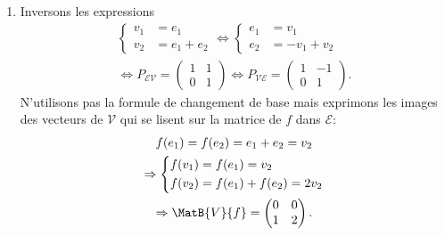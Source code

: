 \begin{enumerate}
 \item Inversons les expressions
\begin{multline*}
 \left\lbrace 
 \begin{aligned}
  v_1 &= e_1 \\ v_2 &= e_1 + e_2
 \end{aligned}
 \right. 
\Leftrightarrow
 \left\lbrace 
 \begin{aligned}
  e_1 &= v_1 \\ e_2 &= - v_1 + v_2
 \end{aligned}
 \right. \\
 \Leftrightarrow P_{\mathcal{E} \mathcal{V}} = \begin{pmatrix}
                                                1 & 1 \\ 0 & 1
                                               \end{pmatrix} 
\Leftrightarrow
P_{\mathcal{V} \mathcal{E} } = \begin{pmatrix}
                                                1 & -1 \\ 0 & 1
                                               \end{pmatrix}.
\end{multline*}
N'utilisons pas la formule de changement de base mais exprimons les images des vecteurs de $\mathcal{V}$ qui se lisent sur la matrice de $f$ dans $\mathcal{E}$:
\begin{multline*}
 f(e_1) = f(e_2)= e_1 + e_2 = v_2 \\
 \Rightarrow
 \left\lbrace 
 \begin{aligned}
  f(v_1) &= f(e_1) = v_2\\ f(v_2) &= f(e_1) + f(e_2) = 2v_2
 \end{aligned}
\right. \\
\Rightarrow
\MatB{V}{f}=
\begin{pmatrix}
 0 & 0 \\ 1 & 2
\end{pmatrix}.
\end{multline*}


\end{enumerate}
